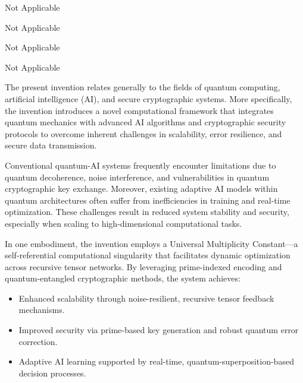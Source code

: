 




\pa 
{} 
Not Applicable

\pa 
{} 
Not Applicable

\pa 
{} 
Not Applicable

\pa 
{} 
Not Applicable

\pa 
{}

\pa 
The present invention relates generally to the fields of quantum computing, artificial intelligence (AI), and secure cryptographic systems. More specifically, the invention introduces a novel computational framework that integrates quantum mechanics with advanced AI algorithms and cryptographic security protocols to overcome inherent challenges in scalability, error resilience, and secure data transmission.

\pa 
Conventional quantum-AI systems frequently encounter limitations due to quantum decoherence, noise interference, and vulnerabilities in quantum cryptographic key exchange. Moreover, existing adaptive AI models within quantum architectures often suffer from inefficiencies in training and real-time optimization. These challenges result in reduced system stability and security, especially when scaling to high-dimensional computational tasks.

\pa 
In one embodiment, the invention employs a Universal Multiplicity Constant—a self-referential computational singularity that facilitates dynamic optimization across recursive tensor networks. By leveraging prime-indexed encoding and quantum-entangled cryptographic methods, the system achieves:
\begin{itemize}
    \item Enhanced scalability through noise-resilient, recursive tensor feedback mechanisms.
    \item Improved security via prime-based key generation and robust quantum error correction.
    \item Adaptive AI learning supported by real-time, quantum-superposition-based decision processes.
\end{itemize}

